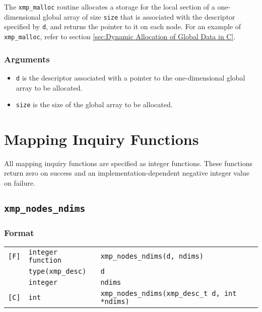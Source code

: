 The {\tt xmp\_malloc} routine allocates a storage for the local section
of a one-dimensional global array of size {\tt size} that is associated
with the descriptor specified by {\tt d}, and returns the pointer to it on
each node. For an example of {\tt xmp\_malloc}, refer to section 
\ref{sec:Dynamic Allocation of Global Data in C}.

\subsubsection*{Arguments}

\begin{itemize}
 \item {\tt d} is the descriptor associated with a pointer to the
       one-dimensional global array to be allocated.
 \item {\tt size} is the size of the global array to be allocated.
\end{itemize}


\section{Mapping Inquiry Functions}

All mapping inquiry functions are specified as integer functions.
These functions return zero on success and an implementation-dependent
negative integer value on failure.

\subsection{\tt xmp\_nodes\_ndims}

\subsubsection*{Format}

\begin{tabular}{lll}

\verb![F]!& {\tt integer function}& {\tt xmp\_nodes\_ndims(d, ndims)}\\
          & {\tt type(xmp\_desc)} & {\tt d}\\
          & {\tt integer} & {\tt ndims}\\

\verb![C]!&  {\tt int}& {\tt xmp\_nodes\_ndims(xmp\_desc\_t d, int *ndims)}\\

\end{tabular}

